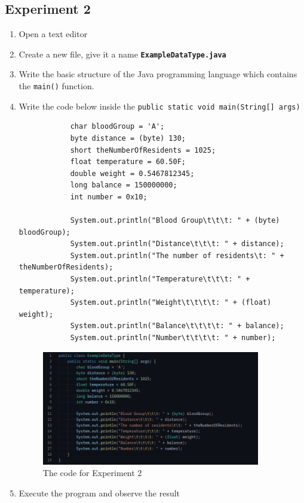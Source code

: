 \documentclass[12pt,titlepage]{article}
\begin{document}
\subsection{Experiment 2}
\begin{enumerate}
    \item Open a text editor
    \item Create a new file, give it a name \texttt{\textbf{ExampleDataType.java}}
    \item Write the basic structure of the Java programming language which contains the \texttt{main()} function.
    \item {
        Write the code below inside the \texttt{public static void main(String[] args)}
        
        \begin{verbatim}
            char bloodGroup = 'A';
            byte distance = (byte) 130;
            short theNumberOfResidents = 1025;
            float temperature = 60.50F;
            double weight = 0.5467812345;
            long balance = 150000000;
            int number = 0x10;

            System.out.println("Blood Group\t\t\t: " + (byte) bloodGroup);
            System.out.println("Distance\t\t\t: " + distance);
            System.out.println("The number of residents\t: " + theNumberOfResidents);
            System.out.println("Temperature\t\t\t: " + temperature);
            System.out.println("Weight\t\t\t\t: " + (float) weight);
            System.out.println("Balance\t\t\t\t: " + balance);
            System.out.println("Number\t\t\t\t: " + number);
        \end{verbatim}

        \begin{figure}[h]
            \centering
            \includegraphics[width=0.9\textwidth]{./images/datatype-code.png}
            \caption{The code for Experiment 2}
        \end{figure}
    }
    \pagebreak
    \item {
        Execute the program and observe the result

}
\end{enumerate}
\end{document}
